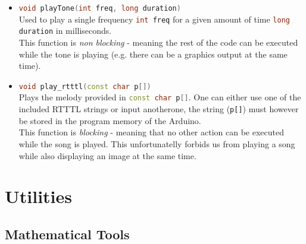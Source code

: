 \documentclass{report}
\begin{document}
\begin{itemize}
	\item \lstinline[language=c++]{void playTone(int freq, long duration)} \\
		Used to play a single frequency \lstinline[language=c++]{int freq} for a given amount of time \lstinline[language=c++]{long duration} in milliseconds.\\
		This function is \emph{non blocking} - meaning the rest of the code can be executed while the tone is playing (e.g. there can be a graphics output at the same time).
	\item \lstinline[language=c++]{void play_rtttl(const char p[])} \\
		Plays the melody provided in \lstinline[language=c++]{const char p[]}. One can either use one of the included RTTTL strings or input anotherone, the string (\lstinline{p[]}) must however be stored in the program memory of the Arduino.\\
		This function is \emph{blocking} - meaning that no other action can be executed while the song is played. This unfortunatelly forbids us from playing a song while also displaying an image at the same time.
\end{itemize}
\section{Utilities}
\subsection{Mathematical Tools}
\end{document}
